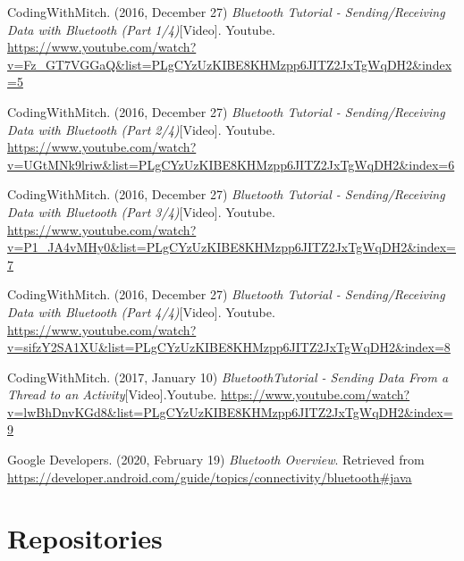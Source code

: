 \documentclass[12pt,a4paper]{article}
\begin{document}
    \newpage
    
    \begin{thebibliography}{9}
    
    
    CodingWithMitch. (2016, December 27)
    \textit{Bluetooth Tutorial - Sending/Receiving Data with Bluetooth (Part 1/4)}[Video].
    Youtube.
    \url{https://www.youtube.com/watch?v=Fz_GT7VGGaQ&list=PLgCYzUzKIBE8KHMzpp6JITZ2JxTgWqDH2&index=5}
    
    CodingWithMitch. (2016, December 27)
    \textit{Bluetooth Tutorial - Sending/Receiving Data with Bluetooth (Part 2/4)}[Video].
    Youtube.
    \url{https://www.youtube.com/watch?v=UGtMNk9lriw&list=PLgCYzUzKIBE8KHMzpp6JITZ2JxTgWqDH2&index=6}
    
    CodingWithMitch. (2016, December 27)
    \textit{Bluetooth Tutorial - Sending/Receiving Data with Bluetooth (Part 3/4)}[Video].
    Youtube.
    \url{https://www.youtube.com/watch?v=P1_JA4vMHy0&list=PLgCYzUzKIBE8KHMzpp6JITZ2JxTgWqDH2&index=7}
    
    CodingWithMitch. (2016, December 27)
    \textit{Bluetooth Tutorial - Sending/Receiving Data with Bluetooth (Part 4/4)}[Video].
    Youtube.
    \url{https://www.youtube.com/watch?v=sifzY2SA1XU&list=PLgCYzUzKIBE8KHMzpp6JITZ2JxTgWqDH2&index=8}
    
    CodingWithMitch. (2017, January 10)
    \textit{BluetoothTutorial - Sending Data From a Thread to an Activity}[Video].Youtube.
    \url{https://www.youtube.com/watch?v=lwBhDnvKGd8&list=PLgCYzUzKIBE8KHMzpp6JITZ2JxTgWqDH2&index=9}
    
    Google Developers. (2020, February 19)
    \textit{Bluetooth Overview}.
    Retrieved from
    \url{https://developer.android.com/guide/topics/connectivity/bluetooth#java}
    
    \end{thebibliography}
    \newpage
    
    \listoffigures
    \newpage

    \lstlistoflistings
    \newpage
    
    \section*{Repositories}
    
\end{document}

